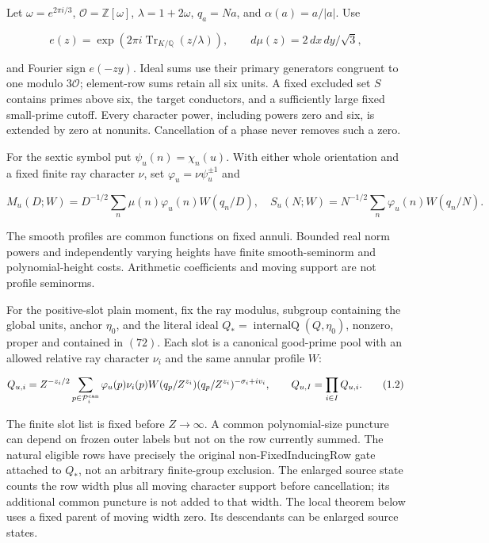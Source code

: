 \documentclass[11pt,a4paper]{article}
\begin{document}
Let \(\omega=e^{2\pi i/3}\), \(\mathcal O=\mathbb Z[\omega]\),
\(\lambda=1+2\omega\), \(q_a=Na\), and \(\alpha(a)=a/|a|\). Use

\[
e(z)=\exp(2\pi i\operatorname{Tr}_{K/\mathbb Q}(z/\lambda)),
\qquad d\mu(z)=2\,dx\,dy/\sqrt3,
\]

and Fourier sign \(e(-zy)\). Ideal sums use their primary generators
congruent to one modulo \(3\mathcal O\); element-row sums retain all six
units. A fixed excluded set \(S\) contains primes above six, the target
conductors, and a sufficiently large fixed small-prime cutoff. Every
character power, including powers zero and six, is extended by zero at
nonunits. Cancellation of a phase never removes such a zero.

For the sextic symbol put \(\psi_u(n)=\chi_n(u)\). With either whole
orientation and a fixed finite ray character \(\nu\), set
\(\varphi_u=\nu\psi_u^{\pm1}\) and

\[
M_u(D;W)=D^{-1/2}\sum_n\mu(n)\varphi_u(n)W(q_n/D),
\quad
S_u(N;W)=N^{-1/2}\sum_n\varphi_u(n)W(q_n/N).
\tag{1.1}
\]

The smooth profiles are common functions on fixed annuli. Bounded real
norm powers and independently varying heights have finite
smooth-seminorm and polynomial-height costs. Arithmetic coefficients and
moving support are not profile seminorms.

For the positive-slot plain moment, fix the ray modulus, subgroup
containing the global units, anchor \(\eta_0\), and the literal ideal
\(Q_*=\operatorname{internalQ}(Q,\eta_0)\), nonzero, proper and
contained in \((72)\). Each slot is a canonical good-prime pool with an
allowed relative ray character \(\nu_i\) and the same annular profile
\(W\):

\[
Q_{u,i}=Z^{-z_i/2}\sum_{p\in\mathcal P_i^{\rm can}}
 \varphi_u(p)\nu_i(p)W(q_p/Z^{z_i})
 (q_p/Z^{z_i})^{-\sigma_i+iv_i},
\qquad Q_{u,I}=\prod_{i\in I}Q_{u,i}.
\tag{1.2}
\]

The finite slot list is fixed before \(Z\to\infty\). A common
polynomial-size puncture can depend on frozen outer labels but not on
the row currently summed. The natural eligible rows have precisely the
original non-FixedInducingRow gate attached to \(Q_*\), not an arbitrary
finite-group exclusion. The enlarged source state counts the row width
plus all moving character support before cancellation; its additional
common puncture is not added to that width. The local theorem below uses
a fixed parent of moving width zero. Its descendants can be enlarged
source states.
\end{document}
